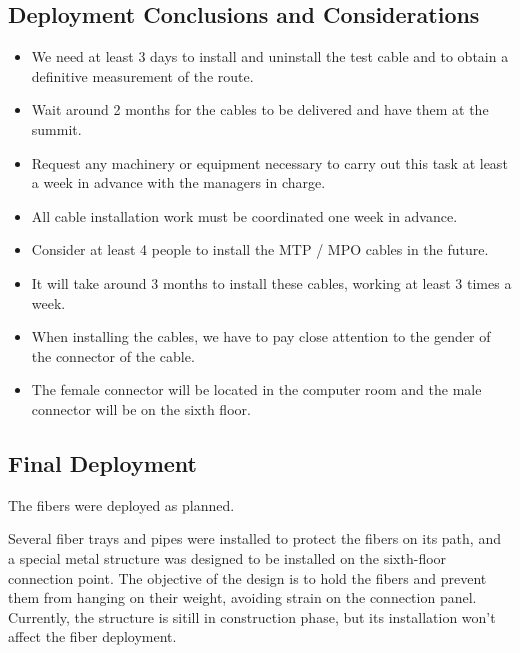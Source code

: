   \subsection{Deployment Conclusions and Considerations}
  \begin{itemize}
    \item We need at least 3 days to install and uninstall the test cable and to obtain a definitive measurement of the route.
    \item Wait around 2 months for the cables to be delivered and have them at the summit.
    \item Request any machinery or equipment necessary to carry out this task at least a week in advance with the managers in charge. 
    \item All cable installation work must be coordinated one week in advance.
    \item Consider at least 4 people to install the MTP / MPO cables in the future.
    \item It will take around 3 months to install these cables, working at least 3 times a week.
    \item When installing the cables, we have to pay close attention to the gender of the connector of the cable.
    \item The female connector will be located in the computer room and the male connector will be on the sixth floor.
  \end{itemize}

\newpage

  \subsection{Final Deployment}

The fibers were deployed as planned. 

Several fiber trays and pipes were installed to protect the fibers on its path, and a special metal structure was designed to be installed on the sixth-floor connection point. The objective of the design is to hold the fibers and prevent them from hanging on their weight, avoiding strain on the connection panel. Currently, the structure is sitill in construction phase, but its installation won't affect the fiber deployment. 

